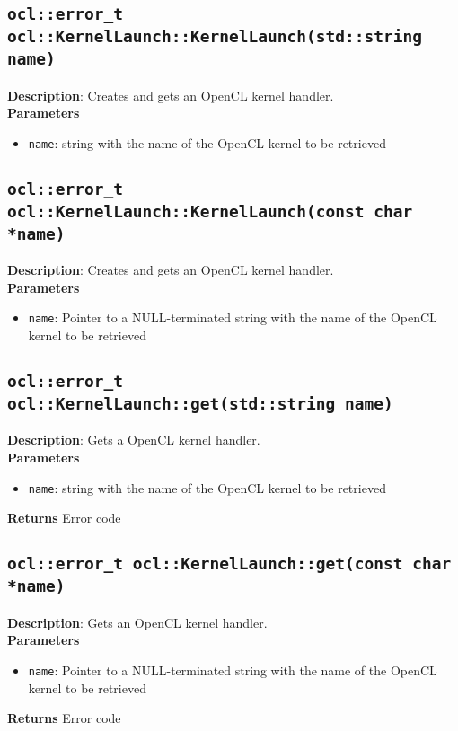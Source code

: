 \subsection{\texttt{ocl::error\_t ocl::KernelLaunch::KernelLaunch(std::string name)}}

\textbf{Description}: Creates and gets an OpenCL kernel handler. \\
\textbf{Parameters}
\begin{itemize}
  \item \texttt{name}: string with the name of the OpenCL kernel to be retrieved
\end{itemize}

\subsection{\texttt{ocl::error\_t ocl::KernelLaunch::KernelLaunch(const char *name)}}

\textbf{Description}: Creates and gets an OpenCL kernel handler. \\
\textbf{Parameters}
\begin{itemize}
  \item \texttt{name}: Pointer to a NULL\hyp{}terminated string with the name of the OpenCL kernel 
to be retrieved
\end{itemize}

\subsection{\texttt{ocl::error\_t ocl::KernelLaunch::get(std::string name)}}

\textbf{Description}: Gets a OpenCL kernel handler. \\
\textbf{Parameters}
\begin{itemize}
  \item \texttt{name}: string with the name of the OpenCL kernel to be retrieved
\end{itemize}
\textbf{Returns} Error code

\subsection{\texttt{ocl::error\_t ocl::KernelLaunch::get(const char *name)}}

\textbf{Description}: Gets an OpenCL kernel handler. \\
\textbf{Parameters}
\begin{itemize}
  \item \texttt{name}: Pointer to a NULL\hyp{}terminated string with the name of the OpenCL kernel 
to be retrieved
\end{itemize}
\textbf{Returns} Error code

